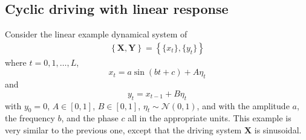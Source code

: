 \subsection{Cyclic driving with linear response}
\label{sec:Cyc}
Consider the linear example dynamical system of
\begin{eqnarray}
\label{eqn:cyceqn}
\left\{\mathbf{X},\mathbf{Y}\right\} = \left\{\{x_t\},\{y_t\}\right\}
\end{eqnarray}
where $t=0,1,\ldots,L$,
\begin{equation*}
x_t = a\sin(bt+c)+A\eta_t
\end{equation*}
and
\begin{equation*}
y_t = x_{t-1} + B\eta_t
\end{equation*}
with $y_0 = 0$, $A\in[0,1]$, $B\in[0,1]$, $\eta_t\sim\mathcal{N}\left(0,1\right)$, and with the amplitude $a$, the frequency $b$, and the phase $c$ all in the appropriate units.  This example is very similar to the previous one, except that the driving system $\mathbf{X}$ is sinusoidal.

